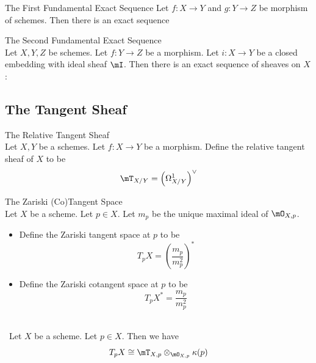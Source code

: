 \documentclass[a4paper]{article}
\begin{document}
\begin{prp}{The First Fundamental Exact Sequence}{} Let $f:X\to Y$ and $g:Y\to Z$ be morphism of schemes. Then there is an exact sequence \\
\end{prp}

\begin{prp}{The Second Fundamental Exact Sequence}{}\\
Let $X,Y,Z$ be schemes. Let $f:Y\to Z$ be a morphism. Let $i:X\to Y$ be a closed embedding with ideal sheaf $\mI$. Then there is an exact sequence of sheaves on $X$: \\
\end{prp}

\subsection{The Tangent Sheaf}
\begin{defn}{The Relative Tangent Sheaf}{}\\
Let $X,Y$ be a schemes. Let $f:X\to Y$ be a morphism. Define the relative tangent sheaf of $X$ to be $$\mT_{X/Y}=\left(\Omega_{X/Y}^1\right)^\vee$$
\end{defn}

\begin{defn}{The Zariski (Co)Tangent Space}{}\\
Let $X$ be a scheme. Let $p\in X$. Let $m_p$ be the unique maximal ideal of $\mO_{X,p}$. 
\begin{itemize}
\item Define the Zariski tangent space at $p$ to be $$T_pX=\left(\frac{m_p}{m_p^2}\right)^\ast$$
\item Define the Zariski cotangent space at $p$ to be $$T_pX^\ast=\frac{m_p}{m_p^2}$$
\end{itemize}
\end{defn}

\begin{prp}{}{}\\\
Let $X$ be a scheme. Let $p\in X$. Then we have $$T_pX\cong\mT_{X,p}\otimes_{\mO_{X,p}}\kappa(p)$$
\end{prp}
\end{document}
